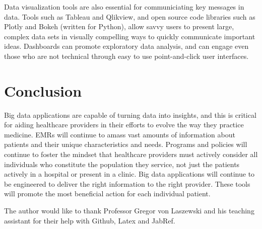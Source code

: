 \documentclass[sigconf]{acmart}
\begin{document}
 Data visualization tools are also essential for communiciating key messages in data. Tools such as Tableau and Qlikview, and open source code libraries such as Plotly and Bokeh (written for Python), allow savvy users to present large, complex data sets in visually compelling ways to quickly communicate important ideas. Dashboards can promote exploratory data analysis, and can engage even those who are not technical through easy to use point-and-click user interfaces.
 
\section{Conclusion}

 Big data applications are capable of turning data into insights, and this is critical for aiding healthcare providers in their efforts to evolve the way they practice medicine. EMRs will continue to amass vast amounts of information about patients and their unique characteristics and needs. Programs and policies will continue to foster the mindset that healthcare providers must actively consider all individuals who constitute the population they service, not just the patients actively in a hospital or present in a clinic. Big data applications will continue to be engineered to deliver the right information to the right provider. These tools will promote the most beneficial action for each individual patient.   

\begin{acks}

  The author would like to thank Professor Gregor von Laszewski and his teaching assistant for their help with Github, Latex and JabRef. 

\end{acks}


 
\end{document}
